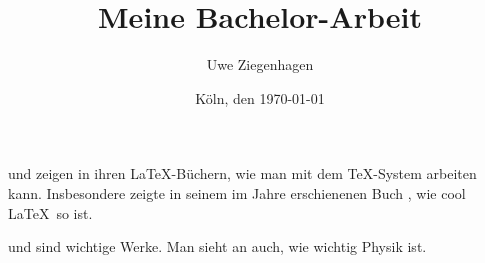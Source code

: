 \documentclass[12pt,ngerman,oneside,parskip=half,DIV=12]{scrbook}
\author{Uwe Ziegenhagen}
\title{Meine Bachelor-Arbeit}
\date{Köln, den \today}
\begin{document}
\maketitle

\tableofcontents

\listoffigures

\listoftables



\cite{knuth} und \cite{Voss2017} zeigen in ihren \LaTeX-Büchern, wie man mit dem \TeX-System arbeiten kann. Insbesondere \citeauthor{Voss2017} zeigte in seinem im Jahre \citeyear{Voss2017} erschienenen Buch , wie cool \LaTeX\ so ist.

\blindtext \cite{Voss2017} und \cite{knuth} sind wichtige Werke. Man sieht an \cite{Aybas2021} auch, wie wichtig Physik ist.




\printbibliography
\end{document}
